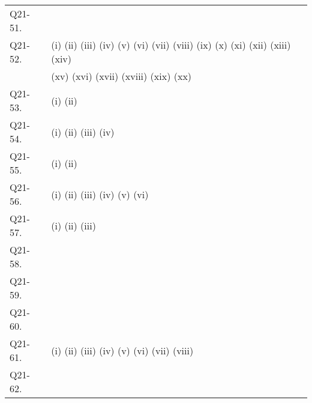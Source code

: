 \documentclass[uplatex,dvipdfmx,a4paper,11pt]{jlreq}
\numberwithin{equation}{section}
\theoremstyle{definition}
\begin{document}
\begin{table}[hbtp]
\begin{tabular}{ll}
    Q21-51. & \quad                                                                                                                                                          \\
    Q21-52. & (i) \quad (ii) \quad (iii) \quad (iv) \quad (v) \quad (vi) \quad (vii) \quad (viii) \quad (ix) \quad (x) \quad (xi) \quad (xii) \quad (xiii) \quad (xiv) \quad \\
            & (xv) \quad (xvi) \quad (xvii) \quad (xviii) \quad (xix) \quad (xx) \quad                                                                                       \\
    Q21-53. & (i) \quad (ii) \quad                                                                                                                                           \\
    Q21-54. & (i) \quad (ii) \quad (iii) \quad (iv) \quad                                                                                                                    \\
    Q21-55. & (i) \quad (ii) \quad                                                                                                                                           \\
    Q21-56. & (i) \quad (ii) \quad (iii) \quad (iv) \quad (v) \quad (vi) \quad                                                                                               \\
    Q21-57. & (i) \quad (ii) \quad (iii) \quad                                                                                                                               \\
    Q21-58. & \quad                                                                                                                                                          \\
    Q21-59. & \quad                                                                                                                                                          \\
    Q21-60. & \quad                                                                                                                                                          \\
    Q21-61. & (i) \quad (ii) \quad (iii) \quad (iv) \quad (v) \quad (vi) \quad (vii) \quad (viii) \quad                                                                      \\
    Q21-62. & \quad                                                                                                                                                          \\

\end{tabular}
\end{table}
\end{document}
